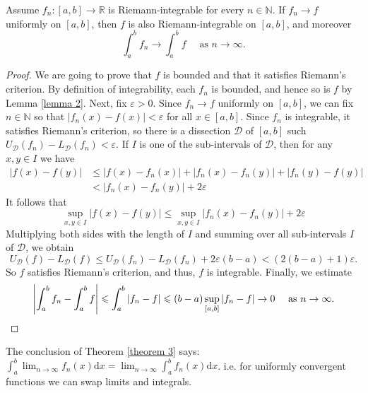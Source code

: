 \documentclass[a4paper]{article}
\begin{document}
\begin{theorem}\label{theorem 3}
    Assume $f_{n}:[a, b] \rightarrow \mathbb{R}$ is Riemann-integrable for every $n \in \mathbb{N}$. If $f_{n} \rightarrow f$ uniformly on $[a, b]$, then $f$ is also Riemann-integrable on $[a, b]$, and moreover
    \[
    \int_{a}^{b} f_{n} \rightarrow \int_{a}^{b} f \quad \text { as } n \rightarrow \infty.
    \]
\end{theorem}
\begin{proof}
    We are going to prove that $f$ is bounded and that it satisfies Riemann's criterion. By definition of integrability, each $f_{n}$ is bounded, and hence so is $f$ by Lemma \ref{lemma 2}.
    Next, fix $\varepsilon>0$. Since $f_{n} \rightarrow f$ uniformly on $[a, b]$, we can fix $n \in \mathbb{N}$ so that $\left|f_{n}(x)-f(x)\right|<\varepsilon$ for all $x \in[a, b]$. Since $f_{n}$ is integrable, it satisfies Riemann's criterion, so there is a dissection $\mathcal{D}$ of $[a, b]$ such $U_{\mathcal{D}}\left(f_{n}\right)-L_{\mathcal{D}}\left(f_{n}\right)<\varepsilon$. If $I$ is one of the sub-intervals of $\mathcal{D}$, then for any $x, y \in I$ we have
    \[
    \begin{aligned}
    |f(x)-f(y)| & \leqslant\left|f(x)-f_{n}(x)\right|+\left|f_{n}(x)-f_{n}(y)\right|+\left|f_{n}(y)-f(y)\right| \\
    &<\left|f_{n}(x)-f_{n}(y)\right|+2 \varepsilon
    \end{aligned}
    \]
    It follows that
    \[
    \sup _{x, y \in I}|f(x)-f(y)| \leqslant \sup _{x, y \in I}\left|f_{n}(x)-f_{n}(y)\right|+2 \varepsilon
    \]
    Multiplying both sides with the length of $I$ and summing over all sub-intervals $I$ of $\mathcal{D}$, we obtain
    \[
    U_{\mathcal{D}}(f)-L_{\mathcal{D}}(f) \leqslant U_{\mathcal{D}}\left(f_{n}\right)-L_{\mathcal{D}}\left(f_{n}\right)+2 \varepsilon(b-a)<(2(b-a)+1) \varepsilon.
    \]
    So $f$ satisfies Riemann's criterion, and thus, $f$ is integrable.
    Finally, we estimate
    \[
    \left|\int_{a}^{b} f_{n}-\int_{a}^{b} f\right| \leqslant \int_{a}^{b}\left|f_{n}-f\right| \leqslant(b-a) \sup _{[a, b]}\left|f_{n}-f\right| \rightarrow 0 \quad \text { as } n \rightarrow \infty .\qedhere
    \]
\end{proof}
\begin{remark}
    The conclusion of Theorem \ref{theorem 3} says: $\int_{a}^{b} \lim _{n \rightarrow \infty} f_{n}(x) \mathrm{d} x=\lim _{n \rightarrow \infty} \int_{a}^{b} f_{n}(x) \mathrm{d} x$. i.e. for uniformly convergent functions we can swap limits and integrals.
\end{remark}
\end{document}
